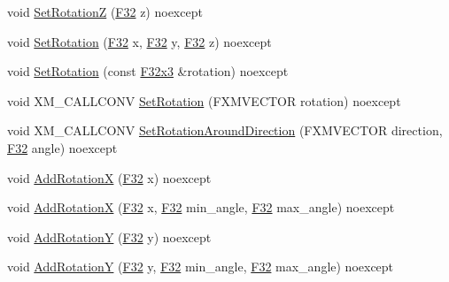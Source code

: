 \begin{DoxyCompactItemize}
\item 
void \mbox{\hyperlink{classmage_1_1_s1_e_t_transform3_d_ac3ec913efbd37e0b0235b39dabe1322d}{Set\+RotationZ}} (\mbox{\hyperlink{namespacemage_aa97e833b45f06d60a0a9c4fc22ae02c0}{F32}} z) noexcept
\item 
void \mbox{\hyperlink{classmage_1_1_s1_e_t_transform3_d_af17a893cd25b7a0d5b478d542d2723b9}{Set\+Rotation}} (\mbox{\hyperlink{namespacemage_aa97e833b45f06d60a0a9c4fc22ae02c0}{F32}} x, \mbox{\hyperlink{namespacemage_aa97e833b45f06d60a0a9c4fc22ae02c0}{F32}} y, \mbox{\hyperlink{namespacemage_aa97e833b45f06d60a0a9c4fc22ae02c0}{F32}} z) noexcept
\item 
void \mbox{\hyperlink{classmage_1_1_s1_e_t_transform3_d_abc4e81766a533acdeaeb6facd3b13437}{Set\+Rotation}} (const \mbox{\hyperlink{namespacemage_a1e3c7a882af461f161caa1cbddaf1fa2}{F32x3}} \&rotation) noexcept
\item 
void X\+M\+\_\+\+C\+A\+L\+L\+C\+O\+NV \mbox{\hyperlink{classmage_1_1_s1_e_t_transform3_d_a3c0bc76b1622a5565823139853dea9a5}{Set\+Rotation}} (F\+X\+M\+V\+E\+C\+T\+OR rotation) noexcept
\item 
void X\+M\+\_\+\+C\+A\+L\+L\+C\+O\+NV \mbox{\hyperlink{classmage_1_1_s1_e_t_transform3_d_a6d3022e5d79fe1e202c9361c174c0f1b}{Set\+Rotation\+Around\+Direction}} (F\+X\+M\+V\+E\+C\+T\+OR direction, \mbox{\hyperlink{namespacemage_aa97e833b45f06d60a0a9c4fc22ae02c0}{F32}} angle) noexcept
\item 
void \mbox{\hyperlink{classmage_1_1_s1_e_t_transform3_d_aa17ea59e8c58f9ba86581f8f6f3c5aec}{Add\+RotationX}} (\mbox{\hyperlink{namespacemage_aa97e833b45f06d60a0a9c4fc22ae02c0}{F32}} x) noexcept
\item 
void \mbox{\hyperlink{classmage_1_1_s1_e_t_transform3_d_ab89289df55eef4bddbffa0f9bd854b55}{Add\+RotationX}} (\mbox{\hyperlink{namespacemage_aa97e833b45f06d60a0a9c4fc22ae02c0}{F32}} x, \mbox{\hyperlink{namespacemage_aa97e833b45f06d60a0a9c4fc22ae02c0}{F32}} min\+\_\+angle, \mbox{\hyperlink{namespacemage_aa97e833b45f06d60a0a9c4fc22ae02c0}{F32}} max\+\_\+angle) noexcept
\item 
void \mbox{\hyperlink{classmage_1_1_s1_e_t_transform3_d_a4c9ba6364729146685a8f8f1835f3898}{Add\+RotationY}} (\mbox{\hyperlink{namespacemage_aa97e833b45f06d60a0a9c4fc22ae02c0}{F32}} y) noexcept
\item 
void \mbox{\hyperlink{classmage_1_1_s1_e_t_transform3_d_a10d648137ed487f9051430845687cd1c}{Add\+RotationY}} (\mbox{\hyperlink{namespacemage_aa97e833b45f06d60a0a9c4fc22ae02c0}{F32}} y, \mbox{\hyperlink{namespacemage_aa97e833b45f06d60a0a9c4fc22ae02c0}{F32}} min\+\_\+angle, \mbox{\hyperlink{namespacemage_aa97e833b45f06d60a0a9c4fc22ae02c0}{F32}} max\+\_\+angle) noexcept

\end{DoxyCompactItemize}
